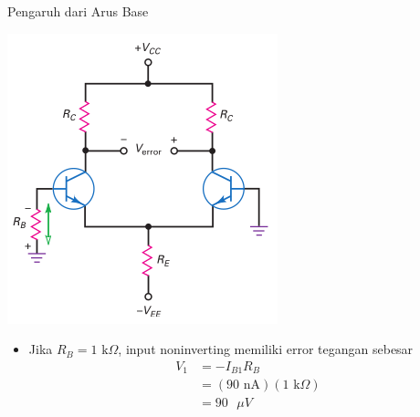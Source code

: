 \documentclass[aspectratio=169]{beamer}
\begin{document}
\begin{frame}{Pengaruh dari Arus Base}
	\begin{multicols}{2}
		\begin{center}
			\includegraphics[height=0.7\textheight]{gambar/01.base_resistor_produces_unwanted_input_voltage}
		\end{center}
		\columnbreak
		\begin{itemize}
			\item Jika $ R_B = 1 \text{ k}\Omega $, input noninverting memiliki error tegangan sebesar
			\begin{align*}
				V_1 &= -I_{B1}R_B \\
				&= ( 90 \text{ nA} ) ( 1 \text{ k}\Omega ) \\
				&= 90 \text{ }\mu V
			\end{align*}
		\end{itemize}
	\end{multicols}
\end{frame}
\end{document}

